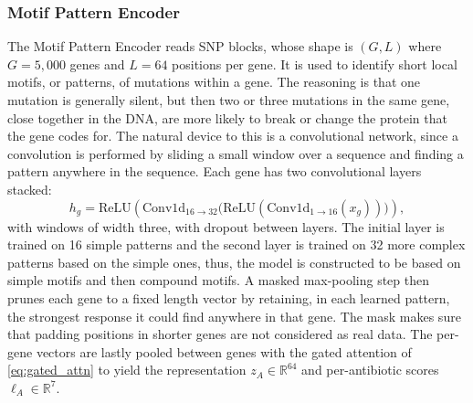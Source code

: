 \documentclass[journal]{IEEEtran}
\begin{document}
\subsubsection{Motif Pattern Encoder}
The Motif Pattern Encoder reads SNP blocks, whose shape is $(G, L)$ where
$G = 5{,}000$ genes and $L = 64$ positions per gene. It is used to identify short
local motifs, or patterns, of mutations within a gene. The reasoning is that one
mutation is generally silent, but then two or three mutations in the same gene,
close together in the DNA, are more likely to break or change the protein that the
gene codes for. The natural device to this is a convolutional network, since a
convolution is performed by sliding a small window over a sequence and finding a
pattern anywhere in the sequence. Each gene has two convolutional layers stacked:
\begin{equation}
h_g = \mathrm{ReLU}\!\left(\mathrm{Conv1d}_{16 \to 32}\big(\mathrm{ReLU}(\mathrm{Conv1d}_{1 \to 16}(x_g))\big)\right),
\label{eq:expertA_conv}
\end{equation}
with windows of width three, with dropout \cite{srivastava2014dropout} between
layers. The initial layer is trained on 16 simple patterns and the second layer is
trained on 32 more complex patterns based on the simple ones, thus, the model is
constructed to be based on simple motifs and then compound motifs. A masked
max-pooling step then prunes each gene to a fixed length vector by retaining, in
each learned pattern, the strongest response it could find anywhere in that gene.
The mask makes sure that padding positions in shorter genes are not considered as
real data. The per-gene vectors are lastly pooled between genes with the gated
attention of \eqref{eq:gated_attn} to yield the representation
$z_A \in \mathbb{R}^{64}$ and per-antibiotic scores $\ell_A \in \mathbb{R}^{7}$.
\end{document}
